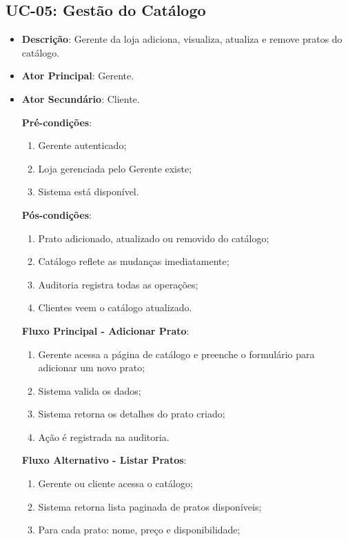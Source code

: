 \subsection{UC-05: Gestão do Catálogo}

\begin{itemize}[topsep=1pt, itemsep=0pt]
  \item[]\textbf{Descrição}: Gerente da loja adiciona, visualiza, atualiza e remove pratos do catálogo.

  \item[]\textbf{Ator Principal}: Gerente.

  \item[]\textbf{Ator Secundário}: Cliente.

  \textbf{Pré-condições}:
  \begin{enumerate}
    \item Gerente autenticado;
    \item Loja gerenciada pelo Gerente existe;
    \item Sistema está disponível.
  \end{enumerate}

  \textbf{Pós-condições}:
  \begin{enumerate}
    \item Prato adicionado, atualizado ou removido do catálogo;
    \item Catálogo reflete as mudanças imediatamente;
    \item Auditoria registra todas as operações;
    \item Clientes veem o catálogo atualizado.
  \end{enumerate}

  \textbf{Fluxo Principal - Adicionar Prato}:
  \begin{enumerate}
    \item Gerente acessa a página de catálogo e preenche o formulário para adicionar um novo prato;
    \item Sistema valida os dados;
    \item Sistema retorna os detalhes do prato criado;
    \item Ação é registrada na auditoria.
  \end{enumerate}

  \textbf{Fluxo Alternativo - Listar Pratos}:
  \begin{enumerate}
    \item Gerente ou cliente acessa o catálogo;
    \item Sistema retorna lista paginada de pratos disponíveis;
    \item Para cada prato: nome, preço e disponibilidade;
  \end{enumerate}


\end{itemize}
